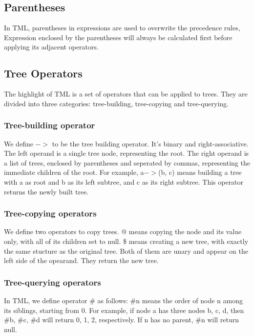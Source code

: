 \documentclass[12pt,psfig,a4]{article}
\begin{document}
\subsection{Parentheses}
In TML, parentheses in expressions are used to overwrite the precedence rules, Expression enclosed by the parentheses will always be calculated first before applying its adjacent operators.

\subsection{Tree Operators}
The highlight of TML is a set of operators that can be applied to trees. They are divided into three categories: tree-building, tree-copying and tree-querying.

\subsubsection{Tree-building operator}
We define $->$ to be the tree building operator. It's binary and right-associative. The left operand is a single tree node, representing the root. The right operand is a list of trees, enclosed by parentheses and seperated by commas, representing the immediate children of the root. For example, a$->$(b, c) means building a tree with a as root and b as its left subtree, and c as its right subtree. This operator returns the newly built tree.

\subsubsection{Tree-copying operators}
We define two operators to copy trees. @ means copying the node and its value only, with all of its children set to null. \$ means creating a new tree, with exactly the same stucture as the original tree. Both of them are unary and appear on the left side of the opearand. They return the new tree.

\subsubsection{Tree-querying operators}
In TML, we define operator \# as follows: \#n means the order of node n among its siblings, starting from 0. For example, if node a has three nodes b, c, d, then \#b, \#c, \#d will return 0, 1, 2, respectively. If n has no parent, \#n will return null.
\end{document}
